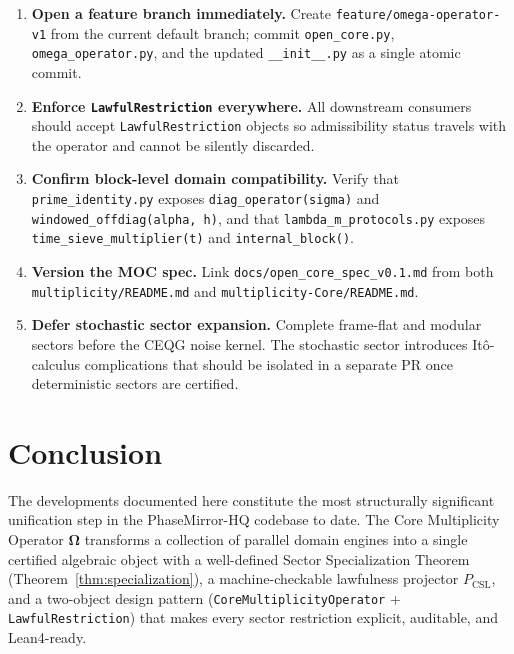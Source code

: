 \documentclass[12pt,a4paper]{article}
\theoremstyle{plain}
\theoremstyle{definition}
\theoremstyle{remark}
\newcommand{\Pcsl}{P_{\mathrm{CSL}}}
\begin{document}
\begin{enumerate}[leftmargin=*, label=\textbf{R\arabic*.}]
  \item \textbf{Open a feature branch immediately.}
        Create \texttt{feature/omega-operator-v1} from the current default
        branch; commit \texttt{open\_core.py}, \texttt{omega\_operator.py},
        and the updated \texttt{\_\_init\_\_.py} as a single atomic commit.

  \item \textbf{Enforce \texttt{LawfulRestriction} everywhere.}
        All downstream consumers should accept \texttt{LawfulRestriction}
        objects so admissibility status travels with the operator and
        cannot be silently discarded.

  \item \textbf{Confirm block-level domain compatibility.}
        Verify that \texttt{prime\_identity.py} exposes
        \texttt{diag\_operator(sigma)} and
        \texttt{windowed\_offdiag(alpha, h)},
        and that \texttt{lambda\_m\_protocols.py} exposes
        \texttt{time\_sieve\_multiplier(t)} and \texttt{internal\_block()}.

  \item \textbf{Version the MOC spec.}
        Link \texttt{docs/open\_core\_spec\_v0.1.md} from both
        \texttt{multiplicity/README.md} and
        \texttt{multiplicity-Core/README.md}.

  \item \textbf{Defer stochastic sector expansion.}
        Complete frame-flat and modular sectors before the CEQG noise kernel.
        The stochastic sector introduces It\^{o}-calculus complications that
        should be isolated in a separate PR once deterministic sectors
        are certified.
\end{enumerate}

\section{Conclusion}
\label{sec:conclusion}

The developments documented here constitute the most structurally
significant unification step in the PhaseMirror-HQ codebase to date.
The Core Multiplicity Operator $\boldsymbol{\Omega}$ transforms a
collection of parallel domain engines into a single certified algebraic
object with a well-defined Sector Specialization Theorem
(Theorem~\ref{thm:specialization}), a machine-checkable lawfulness
projector $\Pcsl$, and a two-object design pattern
(\texttt{CoreMultiplicityOperator} + \texttt{LawfulRestriction})
that makes every sector restriction explicit, auditable, and Lean4-ready.
\end{document}
